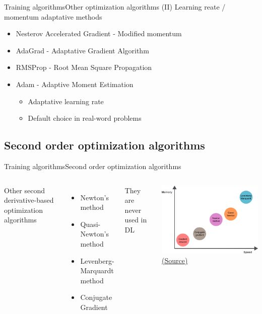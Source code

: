 \documentclass[10pt,compress]{beamer} %
\begin{document}
\begin{frame}{Training algorithms}{Other optimization algorithms (II)}
	Learning reate / momentum  adaptative methods
	\begin{itemize}
		\item Nesterov Accelerated Gradient - Modified momentum
		\item AdaGrad - Adaptative Gradient Algorithm
		\item RMSProp - Root Mean Square Propagation
		\item Adam - Adaptive Moment Estimation
			\begin{itemize}
				\item Adaptative learning rate
				\item Default choice in real-word problems
			\end{itemize}
	\end{itemize}
\end{frame}

\subsection{Second order optimization algorithms}
\begin{frame}{Training algorithms}{Second order optimization algorithms}
	\begin{columns}
		Other second derivative-based optimization algorithms
		\begin{itemize}
			\item Newton's method
			\item Quasi-Newton's method
			\item Levenberg-Marquardt method
			\item Conjugate Gradient
		\end{itemize}
		They are never used in DL
		\begin{center}
			\includegraphics[width=\linewidth]{figs/memory-speed.png}\\
			\scriptsize \href{https://www.neuraldesigner.com/blog/5_algorithms_to_train_a_neural_network}{(Source)}
		\end{center}
	\end{columns}
\end{frame}
\end{document}
